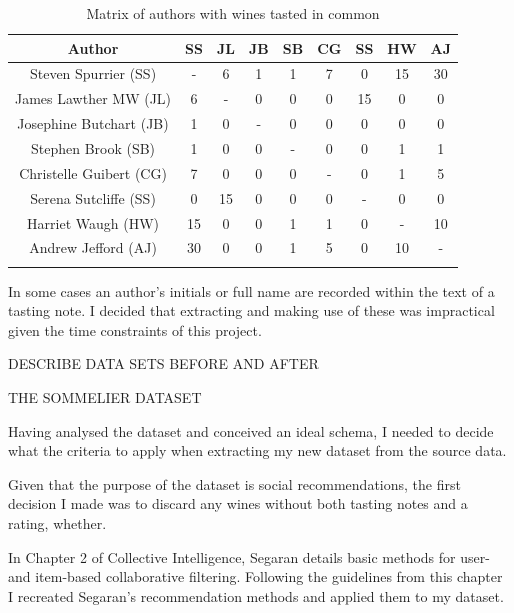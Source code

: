 \begin{table}[ht]
    \caption{Matrix of authors with wines tasted in common}
    \centering
    \begin{tabular}{c c c c c c c c c}
        \\\hline\hline
        Author & SS & JL & JB & SB & CG & SS & HW & AJ
        \\\hline
        Steven Spurrier (SS)     & - & 6  & 1  & 1  & 7  & 0 & 15 & 30 \\
        James Lawther MW (JL)    & 6  & - & 0 & 0 & 0 & 15 & 0 & 0 \\
        Josephine Butchart (JB)  & 1  & 0 & - & 0 & 0 & 0 & 0 & 0 \\
        Stephen Brook (SB)       & 1  & 0 & 0 & - & 0 & 0 & 1  & 1  \\
        Christelle Guibert (CG)  & 7  & 0 & 0 & 0 & - & 0 & 1  & 5  \\
        Serena Sutcliffe (SS)    & 0 & 15 & 0 & 0 & 0 & - & 0 & 0 \\
        Harriet Waugh (HW)       & 15 & 0 & 0 & 1  & 1  & 0 & - & 10 \\
        Andrew Jefford (AJ)      & 30 & 0 & 0 & 1  & 5  & 0 & 10 & - \\
        \\\hline
    \end{tabular}
    \label{table:authormatrix}
\end{table}

In some cases an author's initials or full name are recorded within the text of a tasting note. I decided that extracting and making use of these was impractical given the time constraints of this project.

DESCRIBE DATA SETS BEFORE AND AFTER

THE SOMMELIER DATASET

Having analysed the dataset and conceived an ideal schema, I needed to decide what the criteria to apply when extracting my new dataset from the source data.

Given that the purpose of the dataset is social recommendations, the first decision I made was to discard any wines without both tasting notes and a rating, whether.


In Chapter 2 of Collective Intelligence\cite{Segaran02}, Segaran details basic methods for user- and item-based collaborative filtering. Following the guidelines from this chapter I recreated Segaran's recommendation methods and applied them to my dataset.

